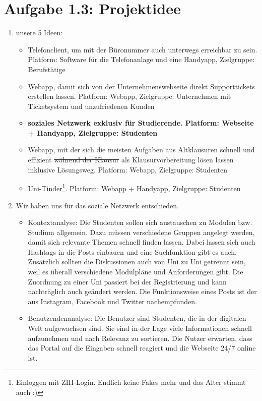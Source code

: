 \documentclass{article}
\begin{document}
	\section*{Aufgabe 1.3: Projektidee}
	\begin{enumerate}[label=(\alph*)]
		\item unsere 5 Ideen:
		\begin{itemize}
			\item Telefonclient, um mit der Büronummer auch unterwegs erreichbar zu sein. Platform: Software für die Telefonanlage und eine Handyapp, Zielgruppe: Berufstätige
			\item Webapp, damit sich von der Unternehmenswebseite direkt Supporttickets erstellen lassen. Platform: Webapp, Zielgruppe: Unternehmen mit Ticketsystem und unzufriedenen Kunden
			\item \textbf{soziales Netzwerk exklusiv für Studierende. Platform: Webseite + Handyapp, Zielgruppe: Studenten}
			\item Webapp, mit der sich die meisten Aufgaben aus Altklausuren schnell und effizient \sout{während der Klausur} als Klausurvorbereitung lösen lassen inklusive Lösungsweg. Platform: Webapp, Zielgruppe: Studenten
			\item Uni-Tinder\footnote{Einloggen mit ZIH-Login. Endlich keine Fakes mehr und das Alter stimmt auch :)}. Platform: Webapp + Handyapp, Zielgruppe: Studenten
		\end{itemize}
		\item Wir haben uns für das soziale Netzwerk entschieden.
		\begin{itemize}
			\item Kontextanalyse: Die Studenten sollen sich austauschen zu Modulen bzw. Studium allgemein. Dazu müssen verschiedene Gruppen angelegt werden, damit sich relevante Themen schnell finden lassen. Dabei lassen sich auch Hashtags in die Posts einbauen und eine Suchfunktion gibt es auch. Zusätzlich sollten die Diskussionen auch von Uni zu Uni getrennt sein, weil es überall verschiedene Modulpläne und Anforderungen gibt. Die Zuordnung zu einer Uni passiert bei der Registrierung und kann nachträglich auch geändert werden. Die Funktionsweise eines Posts ist der aus Instagram, Facebook und Twitter nachempfunden.
			\item Benutzendenanalyse: Die Benutzer sind Studenten, die in der digitalen Welt aufgewachsen sind. Sie sind in der Lage viele Informationen schnell aufzunehmen und nach Relevanz zu sortieren. Die Nutzer erwarten, dass das Portal auf die Eingaben schnell reagiert und die Webseite 24/7 online ist.

\end{itemize}
\end{enumerate}
\end{document}
